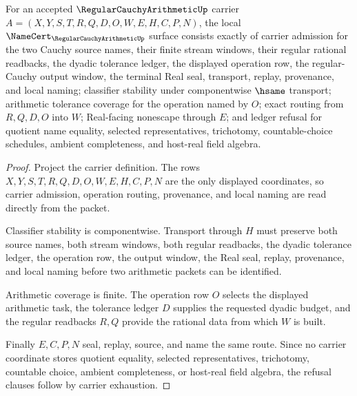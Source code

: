 \begin{theorem}
\label{thm:regular-cauchy-arithmetic-namecert-obligations}
For an accepted $\RegularCauchyArithmeticUp$ carrier $A=(X,Y,S,T,R,Q,D,O,W,E,H,C,P,N)$, the local $\NameCert_{\RegularCauchyArithmeticUp}$ surface consists exactly of carrier admission for the two Cauchy source names, their finite stream windows, their regular rational readbacks, the dyadic tolerance ledger, the displayed operation row, the regular-Cauchy output window, the terminal Real seal, transport, replay, provenance, and local naming; classifier stability under componentwise $\hsame$ transport; arithmetic tolerance coverage for the operation named by $O$; exact routing from $R,Q,D,O$ into $W$; Real-facing nonescape through $E$; and ledger refusal for quotient name equality, selected representatives, trichotomy, countable-choice schedules, ambient completeness, and host-real field algebra.
\end{theorem}
\begin{proof}
Project the carrier definition. The rows $X,Y,S,T,R,Q,D,O,W,E,H,C,P,N$ are the only displayed coordinates, so carrier admission, operation routing, provenance, and local naming are read directly from the packet.

Classifier stability is componentwise. Transport through $H$ must preserve both source names, both stream windows, both regular readbacks, the dyadic tolerance ledger, the operation row, the output window, the Real seal, replay, provenance, and local naming before two arithmetic packets can be identified.

Arithmetic coverage is finite. The operation row $O$ selects the displayed arithmetic task, the tolerance ledger $D$ supplies the requested dyadic budget, and the regular readbacks $R,Q$ provide the rational data from which $W$ is built.

Finally $E,C,P,N$ seal, replay, source, and name the same route. Since no carrier coordinate stores quotient equality, selected representatives, trichotomy, countable choice, ambient completeness, or host-real field algebra, the refusal clauses follow by carrier exhaustion.
\end{proof}

